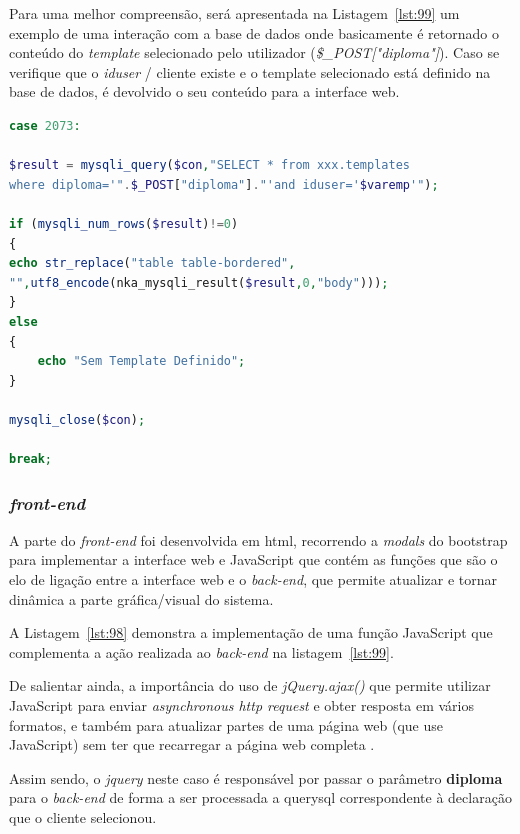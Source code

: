 Para uma melhor compreensão, será apresentada na Listagem~\ref{lst:99} um exemplo de uma interação com a base de dados onde basicamente é retornado o conteúdo do \textit{template} selecionado pelo utilizador (\textit{\$\_POST["diploma"]}). Caso se verifique que o \textit{iduser} / cliente existe e o template selecionado está definido na base de dados, é devolvido o seu conteúdo para a interface web.


\begin{lstlisting}[language={php},
                   caption={Exemplo de request à base de dados},
                   label=lst:99]
case 2073:

$result = mysqli_query($con,"SELECT * from xxx.templates
where diploma='".$_POST["diploma"]."'and iduser='$varemp'");

if (mysqli_num_rows($result)!=0)
{
echo str_replace("table table-bordered",
"",utf8_encode(nka_mysqli_result($result,0,"body")));
}
else
{
	echo "Sem Template Definido";
}

mysqli_close($con);

break;
\end{lstlisting}
\subsubsection{\textit{front-end}}

A parte do \textit{front-end} foi desenvolvida em \acrshort{html}, recorrendo a \textit{modals} do \gls{bootstrap} para implementar a interface web e JavaScript que contém as funções que são o elo de ligação entre a interface web e o \textit{back-end}, que permite atualizar e tornar dinâmica a parte gráfica/visual do sistema.

A Listagem~\ref{lst:98} demonstra a implementação de uma função JavaScript que complementa a ação realizada ao \textit{back-end} na listagem~\ref{lst:99}.

De salientar ainda, a importância do uso de \textit{jQuery.ajax()} que permite utilizar JavaScript para enviar \textit{asynchronous http request} e obter resposta em vários formatos, e também para atualizar partes de uma página web (que use JavaScript) sem ter que recarregar a página web completa \citep{jquery}.

Assim sendo, o \textit{jquery} neste caso é responsável por passar o parâmetro \textbf{diploma} para o \textit{back-end} de forma a ser processada a query\acrshort{sql} correspondente à declaração que o cliente selecionou.



